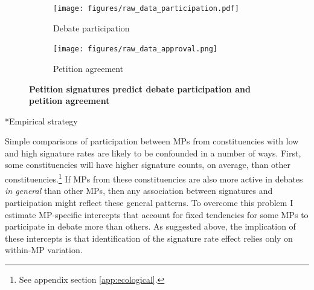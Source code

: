 \documentclass[12pt]{article}
\makeatletter
\renewcommand{\section}{\@startsection{section}{1}{0mm}{-\baselineskip}{0.20\baselineskip}{\centering\normalfont\normalsize\scshape}}
\makeatother
\begin{document}
\begin{figure}[t]
\centering

\begin{subfigure}[b]{.49\textwidth}
\caption{Debate participation}
\texttt{[image: figures/raw\_data\_participation.pdf]}

\end{subfigure}
\begin{subfigure}[b]{.49\textwidth}
\caption{Petition agreement}
\texttt{[image: figures/raw\_data\_approval.png]}

\end{subfigure}
\caption{\label{fig:raw_data_plots}\textbf{Petition signatures predict debate participation and petition agreement}}

\end{figure}

\section*{Empirical strategy}

Simple comparisons of participation between MPs from constituencies with low and high signature rates are likely to be confounded in a number of ways. First, some constituencies will have higher signature counts, on average, than other constituencies.\footnote{See appendix section \ref{app:ecological}.} If MPs from these constituencies are also more active in debates \emph{in general} than other MPs, then any association between signatures and participation might reflect these general patterns. To overcome this problem I estimate MP-specific intercepts that account for fixed tendencies for some MPs to participate in debate more than others. As suggested above, the implication of these intercepts is that identification of the signature rate effect relies only on within-MP variation.
\end{document}
